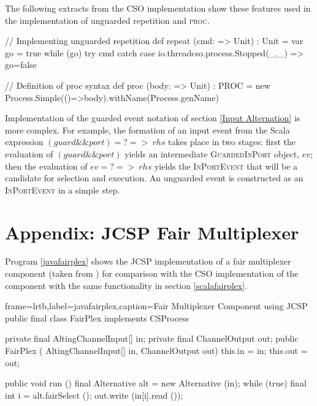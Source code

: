 \documentclass[12pt]{IOS-Book-Article-CPA-2017}
\begin{document}
The following extracts from the CSO implementation show
these features used in the implementation of unguarded repetition and \textsc{proc}.
\begin{code}
// Implementing unguarded repetition
def repeat (cmd: => Unit) : Unit =
{ var go = true
  while (go) 
    try   { cmd } 
    catch { case io.threadcso.process.Stopped(_,_) => go=false } 
}

// Definition of proc syntax
def proc (body: => Unit) : PROC = 
    new Process.Simple(()=>body).withName(Process.genName)
\end{code}
Implementation of the guarded event notation of section \ref{Input Alternation}
is more complex. For example, the formation of an 
input event from the 
Scala expression  $(guard\mathtt{\&\&}port)\mathtt{=?\!\!=>}~rhs$ 
takes place in two stages: first the evaluation of $(guard\mathtt{\&\&}port)$ yields an
intermediate \textsc{GuardedInPort} object, $ev$; then the evaluation of
$ev\mathtt{=?\!\!=>}~rhs$ yields the \textsc{InPortEvent} that will be
a candidate for selection and execution. An unguarded event
is constructed as an \textsc{InPortEvent} in a simple step.


\newpage\section*{Appendix: JCSP Fair Multiplexer}
Program \ref{javafairplex} shows the JCSP implementation of a fair multiplexer
component (taken from \cite{jcsp}) for comparison with the CSO implementation
of the component with the same functionality in section \ref{scalafairplex}.
\begin{code+}[...]{frame=lrtb,label={javafairplex},caption=Fair Multiplexer Component using JCSP}
  public final class FairPlex implements CSProcess { 
      private final AltingChannelInput[] in; 
      private final ChannelOutput        out;
      public FairPlex ( AltingChannelInput[] in, ChannelOutput out) 
      { this.in = in; this.out = out; }
       
      public void run () { 
          final Alternative alt = new Alternative (in); 
          while (true) {  final int i = alt.fairSelect (); 
                          out.write (in[i].read ()); 
          } 
      } 
  } 
\end{code+}
\end{document}
